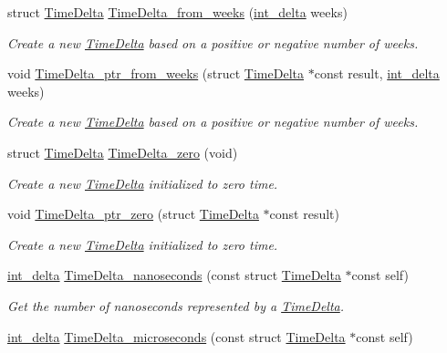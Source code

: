 \begin{DoxyCompactItemize}
struct \hyperlink{structTimeDelta}{Time\-Delta} \hyperlink{time-delta_8h_adeaef2754da892c29f03834c14ad1204}{Time\-Delta\-\_\-from\-\_\-weeks} (\hyperlink{types_8h_a8a67cf99971c5cfeeaa2380ba84a4c92}{int\-\_\-delta} weeks)
\begin{DoxyCompactList}\small\item\em Create a new \hyperlink{structTimeDelta}{Time\-Delta} based on a positive or negative number of weeks. \end{DoxyCompactList}\item 
void \hyperlink{time-delta_8h_a55e3b1a8b44c8805b04f52886a979d4f}{Time\-Delta\-\_\-ptr\-\_\-from\-\_\-weeks} (struct \hyperlink{structTimeDelta}{Time\-Delta} $\ast$const result, \hyperlink{types_8h_a8a67cf99971c5cfeeaa2380ba84a4c92}{int\-\_\-delta} weeks)
\begin{DoxyCompactList}\small\item\em Create a new \hyperlink{structTimeDelta}{Time\-Delta} based on a positive or negative number of weeks. \end{DoxyCompactList}\item 
struct \hyperlink{structTimeDelta}{Time\-Delta} \hyperlink{time-delta_8h_a31e978d4f72d18e2f1404f132b8fca58}{Time\-Delta\-\_\-zero} (void)
\begin{DoxyCompactList}\small\item\em Create a new \hyperlink{structTimeDelta}{Time\-Delta} initialized to zero time. \end{DoxyCompactList}\item 
void \hyperlink{time-delta_8h_ae37ea514d306a44df57cea83e2d42051}{Time\-Delta\-\_\-ptr\-\_\-zero} (struct \hyperlink{structTimeDelta}{Time\-Delta} $\ast$const result)
\begin{DoxyCompactList}\small\item\em Create a new \hyperlink{structTimeDelta}{Time\-Delta} initialized to zero time. \end{DoxyCompactList}\item 
\hyperlink{types_8h_a8a67cf99971c5cfeeaa2380ba84a4c92}{int\-\_\-delta} \hyperlink{time-delta_8h_a6bb384cf10338d51d1e40fdde5d032b8}{Time\-Delta\-\_\-nanoseconds} (const struct \hyperlink{structTimeDelta}{Time\-Delta} $\ast$const self)
\begin{DoxyCompactList}\small\item\em Get the number of nanoseconds represented by a \hyperlink{structTimeDelta}{Time\-Delta}. \end{DoxyCompactList}\item 
\hyperlink{types_8h_a8a67cf99971c5cfeeaa2380ba84a4c92}{int\-\_\-delta} \hyperlink{time-delta_8h_a64740843f3016de2bddd73ca40dc6465}{Time\-Delta\-\_\-microseconds} (const struct \hyperlink{structTimeDelta}{Time\-Delta} $\ast$const self)

\end{DoxyCompactItemize}
